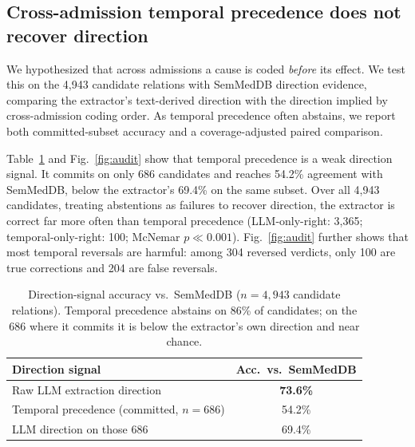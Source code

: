 \documentclass[runningheads]{llncs}
\begin{document}
\subsection{Cross-admission temporal precedence does not recover direction}
We hypothesized that across admissions a cause is coded \emph{before} its effect. We test this on the 4,943 candidate relations with SemMedDB direction evidence, comparing the extractor's text-derived direction with the direction implied by cross-admission coding order. As temporal precedence often abstains, we report both committed-subset accuracy and a coverage-adjusted paired comparison.%

Table~\ref{tab:audit} and Fig.~\ref{fig:audit} show that temporal precedence is a weak direction signal. It commits on only 686 candidates and reaches 54.2\% agreement with SemMedDB, below the extractor's 69.4\% on the same subset. Over all 4,943 candidates, treating abstentions as failures to recover direction, the extractor is correct far more often than temporal precedence (LLM-only-right: 3,365; temporal-only-right: 100; McNemar $p \ll 0.001$). Fig.~\ref{fig:audit} further shows that most temporal reversals are harmful: among 304 reversed verdicts, only 100 are true corrections and 204 are false reversals.

\begin{table}[!htbp]\centering\caption{Direction-signal accuracy vs.\ SemMedDB ($n=4{,}943$ candidate relations). Temporal precedence abstains on 86\% of candidates; on the 686 where it commits it is below the extractor's own direction and near chance.}\label{tab:audit}\footnotesize
\begin{tabular}{lc}\toprule
Direction signal & Acc.\ vs.\ SemMedDB \\\midrule
Raw LLM extraction direction & \textbf{73.6\%} \\
Temporal precedence (committed, $n{=}686$) & 54.2\% \\
LLM direction on those 686 & 69.4\% \\\bottomrule
\end{tabular}\end{table}
\end{document}
